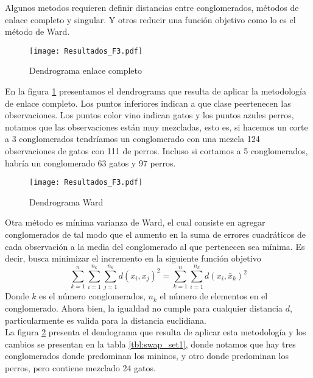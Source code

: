 \documentclass[twocolumn,10pt]{asme2ej}
\begin{document}
Algunos metodos requieren definir distancias entre conglomerados, m\'etodos de enlace completo y singular. Y otros reducir una funci\'on objetivo como lo es el m\'etodo de Ward.\\

\begin{figure}[h]
  \centering
    \texttt{[image: Resultados\_F3.pdf]}
  \caption{Dendrograma enlace completo}
  \label{plot:dendro_enc}
\end{figure}
En la figura \ref{plot:dendro_enc} presentamos el dendrograma que resulta de aplicar la metodolog\'ia de enlace completo. Los puntos inferiores indican a que clase peertenecen las observaciones. Los puntos color vino indican \textcolor{vino}{gatos} y los puntos azules \textcolor{azulperruno}{perros}, notamos que las observaciones est\'an muy mezcladas, esto es, si hacemos un corte a 3 conglomerados tendr\'iamos un conglomerado con una mezcla 124 observaciones de gatos con 111 de perros. Incluso si cortamos a 5 conglomerados, habr\'ia un conglomerado 63 gatos y 97 perros.\\

\begin{figure}[h]
  \centering
    \texttt{[image: Resultados\_F3.pdf]}
  \caption{Dendrograma Ward}
  \label{plot:dendro_ward}
\end{figure}
Otra m\'etodo es m\'inima varianza de Ward, el cual consiste en agregar conglomerados de tal modo que el aumento en la suma de errores cuadr\'aticos de cada observaci\'on a la media del conglomerado al que pertenecen sea m\'inima. Es decir, busca minimizar el incremento en la siguiente funci\'on objetivo
$$\sum_{k=1}^{n}\sum_{i=1}^{n_k}\sum_{j=1}^{n_k}d(x_i,x_j)^2=\sum_{k=1}^{n}\sum_{i=1}^{n_k}d(x_i,\bar{x}_k)^2$$
Donde $k$ es el n\'umero conglomerados, $n_k$ el n\'umero de elementos en el conglomerado. Ahora bien, la igualdad no cumple para cualquier distancia $d$, particularmente es valida para la distancia euclidiana.\\

La figura \ref{plot:dendro_ward} presenta el dendograma que resulta de aplicar esta metodolog\'ia y los cambios se presentan en la tabla \ref{tbl:swap_set1}, donde notamos que hay tres conglomerados donde predominan los mininos, y otro donde predominan los perros, pero contiene mezclado 24 gatos.\\
\end{document}
